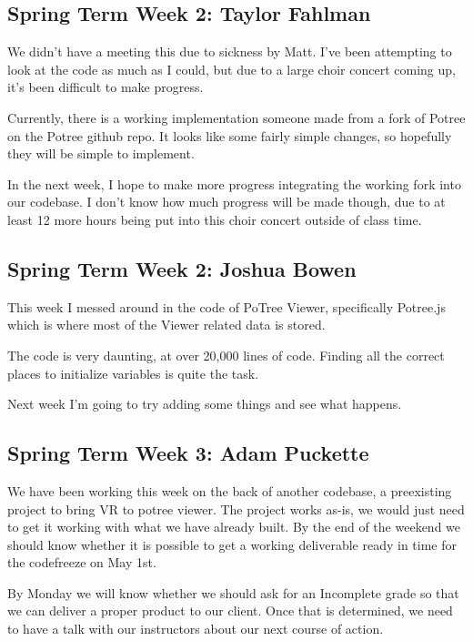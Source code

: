 \documentclass[draftclsnofoot,onecolumn]{IEEEtran}
\begin{document}
\subsection{Spring Term Week 2: Taylor Fahlman}

We didn't have a meeting this due to sickness by Matt. I've been attempting to look at the code as much as I could, but due to a large choir concert coming up, it's been difficult to make progress.

Currently, there is a working implementation someone made from a fork of Potree on the Potree github repo. It looks like some fairly simple changes, so hopefully they will be simple to implement.

In the next week, I hope to make more progress integrating the working fork into our codebase. I don't know how much progress will be made though, due to at least 12 more hours being put into this choir concert outside of class time.

\subsection{Spring Term Week 2: Joshua Bowen}

This week I messed around in the code of PoTree Viewer, specifically Potree.js which is where most of the Viewer related data is stored.

The code is very daunting, at over 20,000 lines of code. Finding all the correct places to initialize variables is quite the task.

Next week I'm going to try adding some things and see what happens.

\subsection{Spring Term Week 3: Adam Puckette}

We have been working this week on the back of another codebase, a preexisting project to bring VR to potree viewer. The project works as-is, we would just need to get it working with what we have already built. By the end of the weekend we should know whether it is possible to get a working deliverable ready in time for the codefreeze on May 1st.

By Monday we will know whether we should ask for an Incomplete grade so that we can deliver a proper product to our client. Once that is determined, we need to have a talk with our instructors about our next course of action.
\end{document}
